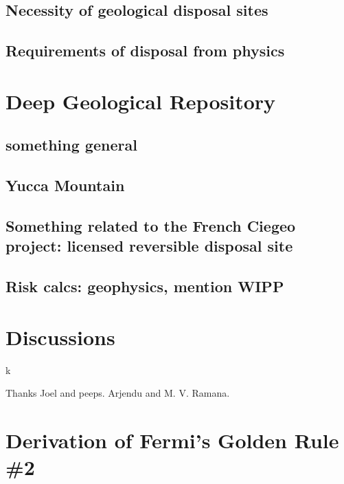\documentclass[preprint,aip,pra]{revtex4-1}
\begin{document}
    \subsection{Necessity of geological disposal sites}
    \subsection{Requirements of disposal from physics}

\section{Deep Geological Repository}
    \subsection{something general}
    \subsection{Yucca Mountain}
    \subsection{Something related to the French Ciegeo project: licensed reversible disposal site}
    \subsection{Risk calcs: geophysics, mention WIPP}
        

\section{Discussions}

k
\begin{acknowledgments}
Thanks Joel and peeps. Arjendu and M. V. Ramana.
\end{acknowledgments}

\pagebreak


\appendix
\section{Derivation of Fermi's Golden Rule \#2}
\label{a:fermi}
\end{document}

